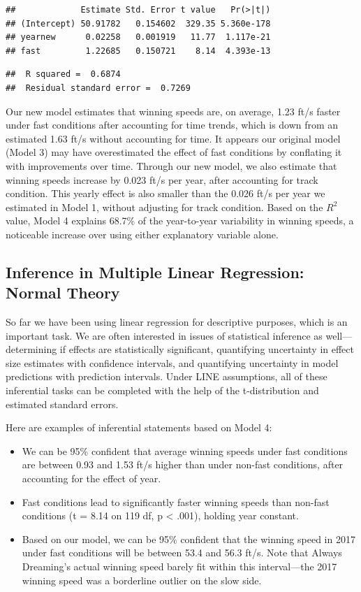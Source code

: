 \documentclass[
]{krantz}
\providecommand{\tightlist}{%
  \setlength{\itemsep}{0pt}\setlength{\parskip}{0pt}}
\begin{document}
\begin{verbatim}
##             Estimate Std. Error t value   Pr(>|t|)
## (Intercept) 50.91782   0.154602  329.35 5.360e-178
## yearnew      0.02258   0.001919   11.77  1.117e-21
## fast         1.22685   0.150721    8.14  4.393e-13
\end{verbatim}

\begin{verbatim}
##  R squared =  0.6874 
##  Residual standard error =  0.7269
\end{verbatim}

Our new model estimates that winning speeds are, on average, 1.23 ft/s faster under fast conditions after accounting for time trends, which is down from an estimated 1.63 ft/s without accounting for time. It appears our original model (Model 3) may have overestimated the effect of fast conditions by conflating it with improvements over time. Through our new model, we also estimate that winning speeds increase by 0.023 ft/s per year, after accounting for track condition. This yearly effect is also smaller than the 0.026 ft/s per year we estimated in Model 1, without adjusting for track condition. Based on the \(R^2\) value, Model 4 explains 68.7\% of the year-to-year variability in winning speeds, a noticeable increase over using either explanatory variable alone.

\hypertarget{multreg-inference}{%
\subsection{Inference in Multiple Linear Regression: Normal Theory}\label{multreg-inference}}

So far we have been using linear regression for descriptive purposes, which is an important task. We are often interested in issues of statistical inference  as well---determining if effects are statistically significant, quantifying uncertainty in effect size estimates with confidence intervals, and quantifying uncertainty in model predictions with prediction intervals. Under LINE assumptions, all of these inferential tasks can be completed with the help of the t-distribution and estimated standard errors.

Here are examples of inferential statements based on Model 4:

\begin{itemize}
\tightlist
\item
  We can be 95\% confident that average winning speeds under fast conditions are between 0.93 and 1.53 ft/s higher than under non-fast conditions, after accounting for the effect of year.
\item
  Fast conditions lead to significantly faster winning speeds than non-fast conditions (t = 8.14 on 119 df, p \textless{} .001), holding year constant.
\item
  Based on our model, we can be 95\% confident that the winning speed in 2017 under fast conditions will be between 53.4 and 56.3 ft/s. Note that Always Dreaming's actual winning speed barely fit within this interval---the 2017 winning speed was a borderline outlier on the slow side.
\end{itemize}
\end{document}

